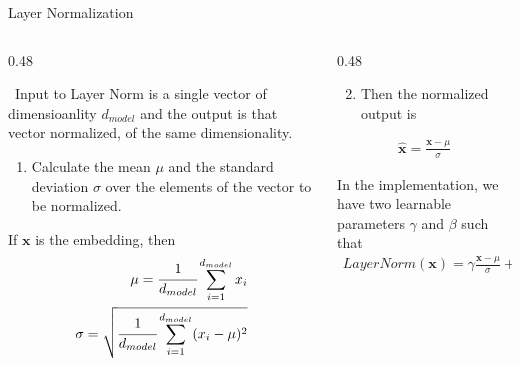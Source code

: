 \documentclass[aspectratio=169,xcolor=dvipsnames,svgnames,x11names,fleqn]{beamer}
\begin{document}
\begin{frame}[fragile]{Layer Normalization}
\begin{columns}[T]
    \begin{column}{0.48\textwidth}
        \begin{tcolorbox}[colback=LNDark, colframe=LNDark, arc=1mm, fontupper=\color{white}]
            \small \faArrowRight \ Input to Layer Norm is a single vector of dimensioanlity $d_{model}$ and the output is that vector normalized, of the same dimensionality.
        \end{tcolorbox}

        \vspace{5pt}
        \scriptsize
        \begin{enumerate}
            \item Calculate the mean $\mu$ and the standard deviation $\sigma$ over the elements of the vector to be normalized.
        \end{enumerate}

        \begin{tcolorbox}[colback=white, colframe=LNEmerald!30, title=\tiny, fonttitle=\bfseries]
            \tiny If $\mathbf{x}$ is the embedding, then
            \begin{align*}
            \mu = \cfrac{1}{d_{model}}\sum_{i=1}^{d_{model}} x_i \\
            \sigma = \sqrt{\cfrac{1}{d_{model}}\sum_{i=1}^{d_{model}} (x_i - \mu)^2 }
            \end{align*}
        \end{tcolorbox}
    \end{column}

    \begin{column}{0.48\textwidth}
        \scriptsize
        \begin{enumerate}
            \setcounter{enumi}{1}
            \item Then the normalized output is 
        \end{enumerate}

        \begin{tcolorbox}[enhanced, colback=white, colframe=LNEmerald!50, borderline west={2pt}{0pt}{LNEmerald}]
            \begin{align*}
            \hat{\mathbf{x}} = \frac{\mathbf{x} - \mu }{\sigma}
            \end{align*}
        \end{tcolorbox}

        \vspace{5pt}
        \begin{tcolorbox}[enhanced, colback=white, colframe=LNEmerald, boxrule=1pt, arc=2mm, title=\centering \tiny ]
            \tiny In the implementation, we have two learnable parameters $\gamma$ and $\beta$ such that
            \begin{align*}
            LayerNorm(\mathbf{x}) =\gamma \frac{\mathbf{x} - \mu }{\sigma} + \beta
            \end{align*}
        \end{tcolorbox}
    \end{column}
\end{columns}
\end{frame}
\end{document}
